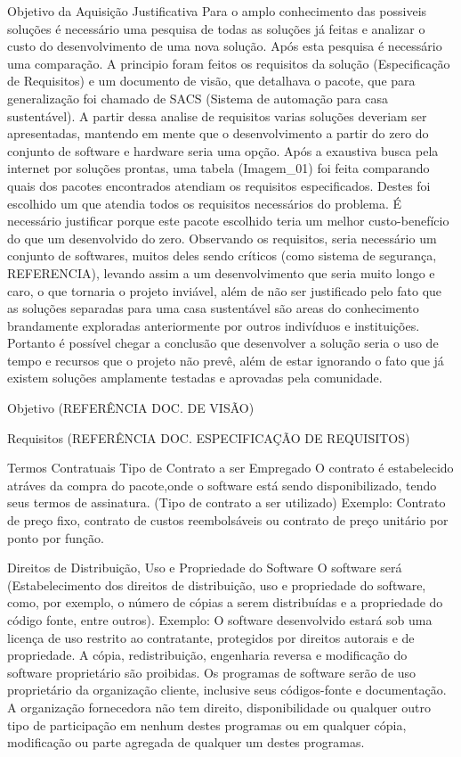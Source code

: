 Objetivo da Aquisição
Justificativa
    Para o amplo conhecimento das possiveis soluções é necessário uma pesquisa de todas as soluções já feitas e analizar o custo do desenvolvimento de uma nova solução. Após esta pesquisa é necessário uma comparação.
A principio foram feitos os requisitos da solução (Especificação de Requisitos) e um documento de visão, que detalhava o pacote, que para generalização foi chamado de SACS (Sistema de automação para casa sustentável). A partir dessa analise de requisitos varias soluções deveriam ser apresentadas, mantendo em mente que o desenvolvimento a partir do zero do conjunto de software e hardware seria uma opção. Após a exaustiva busca pela internet por soluções prontas, uma tabela (Imagem\_01) foi feita comparando quais dos pacotes encontrados atendiam os requisitos especificados. Destes foi escolhido um que atendia todos os requisitos necessários do problema.
É necessário justificar porque este pacote escolhido teria um melhor custo-benefício do que um desenvolvido do zero. Observando os requisitos, seria necessário um conjunto de softwares, muitos deles sendo críticos (como sistema de segurança, REFERENCIA), levando assim a um desenvolvimento que seria muito longo e caro, o que tornaria o projeto inviável, além de não ser justificado pelo fato que as soluções separadas para uma casa sustentável são areas do conhecimento brandamente exploradas anteriormente por outros indivíduos e instituições. Portanto é possível chegar a conclusão que desenvolver a solução seria o uso de tempo e recursos que o projeto não prevê, além de estar ignorando o fato que já existem soluções amplamente testadas e aprovadas pela comunidade.


Objetivo
(REFERÊNCIA DOC. DE VISÃO)

Requisitos
        (REFERÊNCIA DOC. ESPECIFICAÇÃO DE REQUISITOS)





Termos Contratuais
Tipo de Contrato a ser Empregado
O contrato é estabelecido atráves da compra do pacote,onde o software está sendo disponibilizado, tendo seus termos de assinatura.
(Tipo de contrato a ser utilizado) 
Exemplo: Contrato de preço fixo, contrato de custos reembolsáveis ou contrato de preço unitário por ponto por função. 

Direitos de Distribuição, Uso e Propriedade do Software
            O software será 
(Estabelecimento dos direitos de distribuição, uso e propriedade do software, como, por exemplo, o número de cópias a serem distribuídas e a propriedade do código fonte, entre outros). 
Exemplo: O software desenvolvido estará sob uma licença de uso restrito ao contratante, protegidos por direitos autorais e de propriedade. A cópia, redistribuição, engenharia reversa e modificação do software proprietário são proibidas. Os programas de software serão de uso proprietário da organização cliente, inclusive seus códigos-fonte e documentação. A organização fornecedora não tem direito, disponibilidade ou qualquer outro tipo de participação em nenhum destes programas ou em qualquer cópia, modificação ou parte agregada de qualquer um destes programas. 

